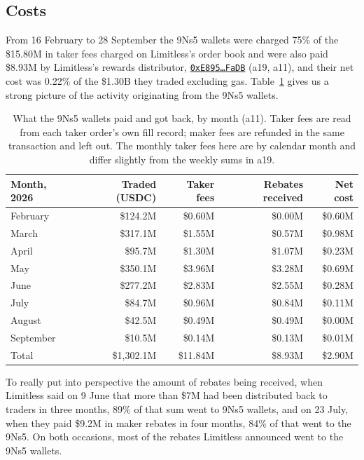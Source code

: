 \documentclass[11pt]{article}
\begin{document}
\subsection{Costs}

From 16 February to 28 September the 9Ns5 wallets were charged 75\% of the \$15.80M in taker fees charged on Limitless's order book and were also paid \$8.93M by Limitless's rewards distributor, \href{https://basescan.org/address/0xE895CaE6B705d584b03cd82Fdd57cf7F8c52FaDB}{\texttt{0xE895\ldots FaDB}} (a19, a11), and their net cost was 0.22\% of the \$1.30B they traded excluding gas.
Table~\ref{tab:fees} gives us a strong picture of the activity originating from the 9Ns5 wallets.

\begin{table}[h]
\centering
\small
\begin{tabular}{lrrrr}
\toprule
Month, 2026 & Traded (USDC) & Taker fees & Rebates received & Net cost \\
\midrule
February & \$124.2M & \$0.60M & \$0.00M & \$0.60M \\
March & \$317.1M & \$1.55M & \$0.57M & \$0.98M \\
April & \$95.7M & \$1.30M & \$1.07M & \$0.23M \\
May & \$350.1M & \$3.96M & \$3.28M & \$0.69M \\
June & \$277.2M & \$2.83M & \$2.55M & \$0.28M \\
July & \$84.7M & \$0.96M & \$0.84M & \$0.11M \\
August & \$42.5M & \$0.49M & \$0.49M & \$0.00M \\
September & \$10.5M & \$0.14M & \$0.13M & \$0.01M \\
\midrule
Total & \$1,302.1M & \$11.84M & \$8.93M & \$2.90M \\
\bottomrule
\end{tabular}
\caption{What the 9Ns5 wallets paid and got back, by month (a11).
Taker fees are read from each taker order's own fill record; maker fees are refunded in the same transaction and left out.
The monthly taker fees here are by calendar month and differ slightly from the weekly sums in a19.}
\label{tab:fees}
\end{table}

To really put into perspective the amount of rebates being received, when Limitless said on 9 June that more than \$7M had been distributed back to traders in three months, 89\% of that sum went to 9Ns5 wallets, and on 23 July, when they paid \$9.2M in maker rebates in four months, 84\% of that went to the 9Ns5.
On both occasions, most of the rebates Limitless announced went to the 9Ns5 wallets.
\end{document}
